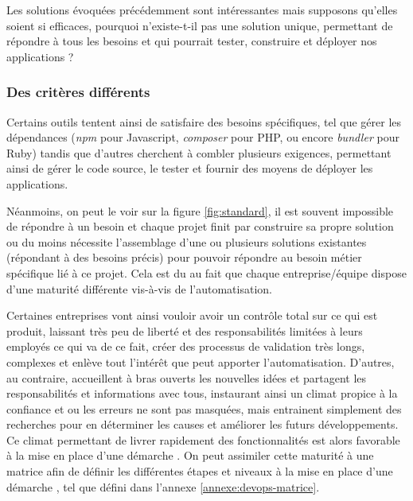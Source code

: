 Les solutions évoquées précédemment sont intéressantes mais supposons qu'elles soient si efficaces, pourquoi n'existe-t-il pas une solution unique, permettant de répondre à tous les besoins et qui pourrait tester, construire et déployer nos applications ?

\subsubsection{Des critères différents}

Certains outils tentent ainsi de satisfaire des besoins spécifiques, tel que gérer les dépendances (\emph{npm} pour Javascript, \emph{composer} pour \gls{PHP}, ou encore \emph{bundler} pour Ruby) tandis que d'autres cherchent à combler plusieurs exigences, permettant ainsi de gérer le code source, le tester et fournir des moyens de déployer les applications.


Néanmoins, on peut le voir sur la figure \ref{fig:standard}, il est souvent impossible de répondre à un besoin  et chaque projet finit par construire sa propre solution ou du moins nécessite l'assemblage d'une ou plusieurs solutions existantes (répondant à des besoins précis) pour pouvoir répondre au besoin métier spécifique lié à ce projet. Cela est du au fait que chaque entreprise/équipe dispose d'une maturité différente vis-à-vis de l'automatisation.

Certaines entreprises vont ainsi vouloir avoir un contrôle total sur ce qui est produit, laissant très peu de liberté et des responsabilités limitées à leurs employés ce qui va de ce fait, créer des processus de validation très longs, complexes et enlève tout l'intérêt que peut apporter l'automatisation. D'autres, au contraire, accueillent à bras ouverts les nouvelles idées et partagent les responsabilités et informations avec tous, instaurant ainsi un climat propice à la confiance et ou les erreurs ne sont pas masquées, mais entrainent simplement des recherches pour en déterminer les causes et améliorer les futurs développements. Ce climat permettant de livrer rapidement des fonctionnalités est alors favorable à la mise en place d'une démarche \devops. On peut assimiler cette maturité à une matrice afin de définir les différentes étapes et niveaux à la mise en place d'une démarche \devops, tel que défini dans l'annexe \ref{annexe:devops-matrice}.

